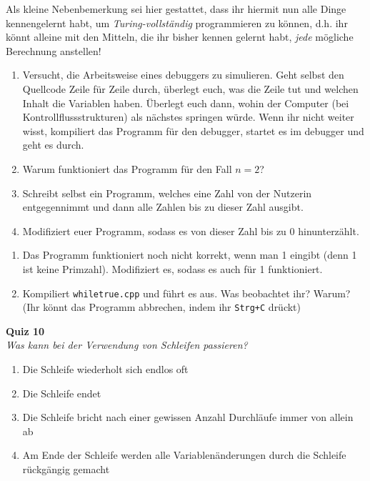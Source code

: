 Als kleine Nebenbemerkung sei hier gestattet, dass ihr hiermit nun alle Dinge
kennengelernt habt, um \emph{Turing-vollständig} programmieren zu können, d.h.
ihr könnt alleine mit den Mitteln, die ihr bisher kennen gelernt habt,
\emph{jede} mögliche Berechnung anstellen!

\begin{praxis}
      \begin{enumerate}
            \item Versucht, die Arbeitsweise eines debuggers zu simulieren. Geht selbst
                  den Quellcode Zeile für Zeile durch, überlegt euch, was die Zeile tut
                  und welchen Inhalt die Variablen haben. Überlegt euch dann, wohin der
                  Computer (bei Kontrollflussstrukturen) als nächstes springen würde.
                  Wenn ihr nicht weiter wisst, kompiliert das Programm für den debugger,
                  startet es im debugger und geht es durch.
            \item Warum funktioniert das Programm für den Fall $n = 2$?
            \item Schreibt selbst ein Programm, welches eine Zahl von der Nutzerin
                  entgegennimmt und dann alle Zahlen bis zu dieser Zahl ausgibt.
            \item Modifiziert euer Programm, sodass es von dieser Zahl bis zu 0
                  hinunterzählt.
      \end{enumerate}
\end{praxis}

\begin{spiel}
      \begin{enumerate}
            \item Das Programm funktioniert noch nicht korrekt, wenn man 1 eingibt
                  (denn 1 ist keine Primzahl). Modifiziert es, sodass es auch für 1
                  funktioniert.
            \item Kompiliert \texttt{whiletrue.cpp} und führt es aus. Was beobachtet
                  ihr? Warum? (Ihr könnt das Programm abbrechen, indem ihr
                  \texttt{Strg+C} drückt)
      \end{enumerate}
      

\end{spiel}

\textbf{Quiz 10}\\
\textit{Was kann bei der Verwendung von Schleifen passieren?}
\begin{enumerate}[label=\alph*)]
    \item Die Schleife wiederholt sich endlos oft
    \item Die Schleife endet
    \item Die Schleife bricht nach einer gewissen Anzahl Durchläufe immer von allein ab
    \item Am Ende der Schleife werden alle Variablenänderungen durch die Schleife rückgängig gemacht
\end{enumerate}
